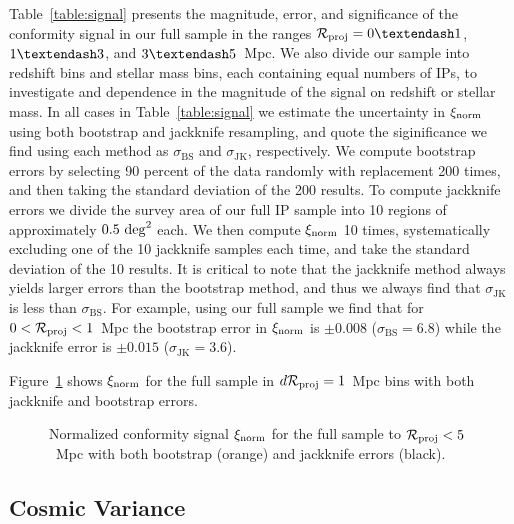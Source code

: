 Table~\ref{table:signal} presents the magnitude, error, and significance of the conformity signal in our full sample in the ranges $\Rproj=0\textendash1$, $1\textendash3$, and $3\textendash5$~Mpc.
We also divide our sample into redshift bins and stellar mass bins, each containing equal numbers of IPs, to investigate and dependence in the magnitude of the signal on redshift or stellar mass.
In all cases in Table~\ref{table:signal} we estimate the uncertainty in $\xi_{\textrm{norm}}$ using both bootstrap and jackknife resampling,
and quote the siginificance we find using each method as $\sigma_{\textrm{BS}}$ and $\sigma_{\textrm{JK}}$, respectively.
We compute bootstrap errors by selecting 90 percent of the data randomly with replacement 200 times, and then taking the standard deviation of the 200 results.
To compute jackknife errors we divide the survey area of our full IP sample into 10 regions of approximately $0.5~\mathrm{deg}^2$ each.
We then compute $\xi_{\textrm{norm}}$ 10 times, systematically excluding one of the 10 jackknife samples each time, and take the standard deviation of the 10 results.
It is critical to note that the jackknife method always yields larger errors than the bootstrap method, and thus we always find that $\sigma_{\textrm{JK}}$ is less than $\sigma_{\textrm{BS}}$.
For example, using our full sample we find that for {$0<\mathcal{R}_{\text{proj}}<1$~Mpc} the bootstrap error in $\xi_{\textrm{norm}}$ is ${\pm0.008}$ ($\sigma_{\textrm{BS}}=6.8$) while the jackknife error is ${\pm0.015}$
($\sigma_{\textrm{JK}}=3.6$).

Figure~\ref{fig:normsig_full} shows $\xi_{\textrm{norm}}$ for the full sample in {$d\mathcal{R}_{\text{proj}}=1$~Mpc} bins with both jackknife and bootstrap errors.



\begin{figure}
  \epstrim{0.3in 0.1in 0.2in 0.3in}
  \caption{Normalized conformity signal $\xi_{\textrm{norm}}$ for the full sample to {$\mathcal{R}_{\text{proj}}<5$~Mpc} with both bootstrap (orange) and jackknife errors (black).
}
  \label{fig:normsig_full}
\end{figure}

\subsection{Cosmic Variance}\label{sec:cosmic_var}

